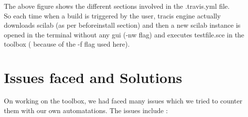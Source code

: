 \documentclass[12pt,a4paper]{report}
\begin{document}
The above figure shows the different sections involved in the .travis.yml file.\\
So each time when a build is triggered by the user, tracis engine actually downloads scilab (as per before\textunderscore install section) and then a new scilab instance is opened in the terminal without any gui (-nw flag) and executes testfile.sce in the toolbox ( because of the -f flag used here).















\chapter{\textbf{Issues faced and Solutions}}
On working on the toolbox, we had faced many issues which we tried to counter them with our own automatations. The issues include :\\
\end{document}

